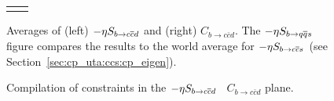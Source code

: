 \begin{figure}[htb]
\begin{center}
\begin{tabular}{cc}
{      }
    \end{tabular}
  \end{center}
  \vspace{-0.8cm}
  \caption{
    Averages of 
    (left) $-\etacp S_{b \to c\bar c d}$ and (right) $C_{b \to c\bar c d}$.
    The $-\etacp S_{b \to q\bar q s}$ figure compares the results to 
    the world average 
    for $-\etacp S_{b \to c\bar c s}$ (see Section~\ref{sec:cp_uta:ccs:cp_eigen}).
  }
  \label{fig:cp_uta:ccd}
\end{figure}

\begin{figure}[htb]
  \begin{center}
  \end{center}
  \vspace{-0.8cm}
  \caption{
    Compilation of constraints in the 
    $-\etacp S_{b \to c\bar c d}$ \vs\ $C_{b \to c\bar c d}$ plane.
  }
  \label{fig:cp_uta:ccd_SvsC-all}
\end{figure}


\clearpage
{}
\label{sec:cp_uta:qqd}

